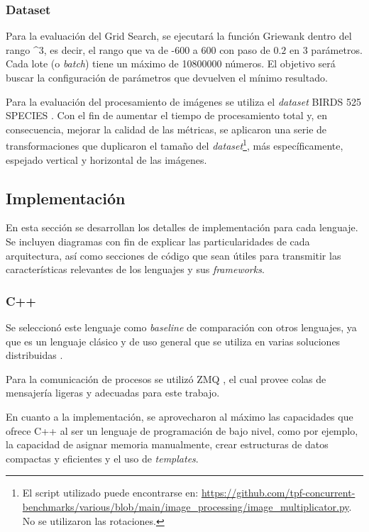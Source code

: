 \documentclass[11pt]{article}
\let\Oldsubsection\subsection
\renewcommand{\subsection}{\FloatBarrier\Oldsubsection}
\let\Oldsubsubsection\subsubsection
\renewcommand{\subsubsection}{\FloatBarrier\Oldsubsubsection}
\newcommand{\english}[1]{\textit{#1}}
\begin{document}
\subsubsection{Dataset}

Para la evaluación del Grid Search, se ejecutará la función Griewank \cite{sis_dist:griewank} dentro del rango \break
[-600; 600; $0.2$]\^{}3, es decir, el rango que va de -600 a 600 con paso de $0.2$ en 3 parámetros. Cada lote (o \english{batch}) tiene un máximo de 10800000 números. El objetivo será buscar la configuración de parámetros que devuelven el mínimo resultado.

Para la evaluación del procesamiento de imágenes se utiliza el \english{dataset} BIRDS 525 SPECIES \cite{sis_dist:birds_dataset}. Con el fin de aumentar el tiempo de procesamiento total y, en consecuencia, mejorar la calidad de las métricas, se aplicaron una serie de transformaciones que duplicaron el tamaño del \english{dataset}\footnote{El script utilizado puede encontrarse en: \url{https://github.com/tpf-concurrent-benchmarks/various/blob/main/image_processing/image_multiplicator.py}. No se utilizaron las rotaciones.}, más específicamente, espejado vertical y horizontal de las imágenes.

\newpage

\subsection{Implementación}

En esta sección se desarrollan los detalles de implementación para cada lenguaje. Se incluyen diagramas con fin de explicar las particularidades de cada arquitectura, así como secciones de código que sean útiles para transmitir las características relevantes de los lenguajes y sus \english{frameworks}.

\subsubsection{C++}

Se seleccionó este lenguaje como \english{baseline} de comparación con otros lenguajes, ya que es un lenguaje clásico y de uso general que se utiliza en varias soluciones distribuidas \cite{cpp:ex:ray-io} \cite{cpp:ex:red-panda}.

Para la comunicación de procesos se utilizó ZMQ \cite{cpp:lib:zmq}, el cual provee colas de mensajería ligeras y adecuadas para este trabajo.

En cuanto a la implementación, se aprovecharon al máximo las capacidades que ofrece C++ al ser un lenguaje de programación de bajo nivel, como por ejemplo, la capacidad de asignar memoria manualmente, crear estructuras de datos compactas y eficientes y el uso de \english{templates}.
\end{document}
